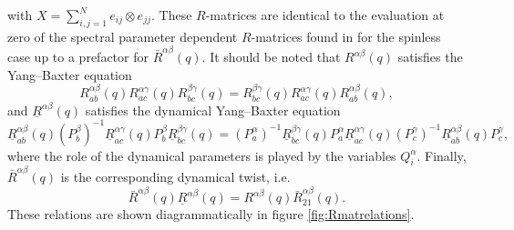 with $X = \sum_{i,j=1}^N e_{ij} \otimes e_{jj}$. These $R$-matrices are identical to the evaluation at zero of the spectral parameter dependent 
$R$-matrices found in \cite{arutyunov_quantum_2019} for the spinless case up to a prefactor for $\bar R^{\alpha\beta}(q)$. It should be noted that $R^{\alpha\beta}(q)$ satisfies the Yang--Baxter equation
\begin{equation}
    R_{ab}^{\alpha\beta}(q) R_{ac}^{\alpha\gamma}(q) R_{bc}^{\beta\gamma}(q) = R_{bc}^{\beta\gamma}(q) R_{ac}^{\alpha\gamma}(q) R_{ab}^{\alpha\beta}(q),
\end{equation}
and $\underline R^{\alpha\beta}(q)$ satisfies the dynamical Yang--Baxter equation
\begin{equation}
    \underline R_{ab}^{\alpha\beta}(q) (P_b^\beta)^{-1} \underline R_{ac}^{\alpha\gamma}(q) P_b^\beta \underline R_{bc}^{\beta\gamma}(q) = (P_a^\alpha)^{-1} \underline R_{bc}^{\beta\gamma}(q) P_a^\alpha \underline R_{ac}^{\alpha\gamma}(q) (P_c^\gamma)^{-1} \underline R_{ab}^{\alpha\beta}(q) P_c^\gamma,
\end{equation}
where the role of the dynamical parameters is played by the variables $Q_i^\alpha$. Finally, $\bar R^{\alpha\beta}(q)$ is the corresponding dynamical twist, i.e.
\begin{equation}\label{eq:dynamicalTwistRel}
    \bar R^{\alpha\beta}(q) \underline R^{\alpha\beta}(q) = R^{\alpha\beta}(q) \bar R_{21}^{\alpha\beta}(q).
\end{equation}
These relations are shown diagrammatically in figure \ref{fig:Rmatrelations}.
